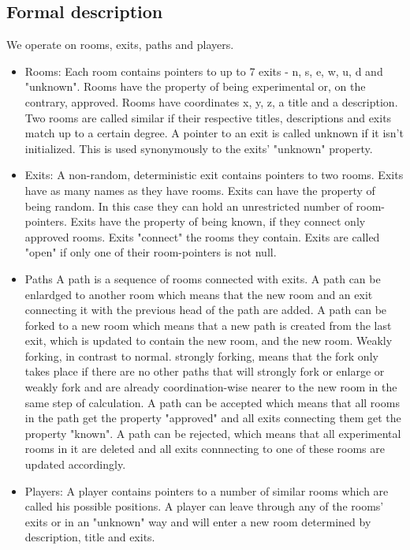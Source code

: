 \documentclass[11pt]{article}
\begin{document}
\subsection{Formal description}
We operate on rooms, exits, paths and players.
\begin{itemize}
\item{Rooms:} Each room contains pointers to up to 7 exits - n, s, e, w, u, d and "unknown". Rooms
have the property of being experimental or, on the contrary, approved. Rooms have coordinates x, y,
z, a title and a description. Two rooms are called similar if their respective titles, descriptions
and exits match up to a certain degree. A pointer to an exit is called unknown if it isn't
initialized. This is used synonymously to the exits' "unknown" property. 
\item{Exits:} A non-random, deterministic exit contains pointers to two rooms. Exits have as many
names as they have rooms. Exits can have the
property of being random. In this case they can hold an unrestricted number of room-pointers.  Exits
have the property of being known, if they connect only approved rooms. Exits "connect" the rooms they
contain. Exits are called "open" if only one of their room-pointers is not null.
\item{Paths} A path is a sequence of rooms connected with exits. A path can be enlardged to
another room which means that the new room and an exit connecting it with the previous head of the
path are added. A path can be forked to a new room which means that a new path is created from the
last exit, which is updated to contain the new room, and the new room. Weakly forking, in contrast to
normal. strongly forking, means that the fork only takes place if there are no other paths that will
strongly fork or enlarge or weakly fork and are already coordination-wise nearer to the new room
in the same step of calculation. A path
can be accepted which means that all rooms in the path get the property "approved" and all exits
connecting them get the property "known". A path can be rejected, which means that all experimental
rooms in it are deleted and all exits connnecting to one of these rooms are updated accordingly.
\item{Players:} A player contains pointers to a number of similar rooms which are called his possible
positions. A player can leave through any of the rooms' exits or in an "unknown" way and will enter a
new room determined by description, title and exits.
\end{itemize}
\end{document}
